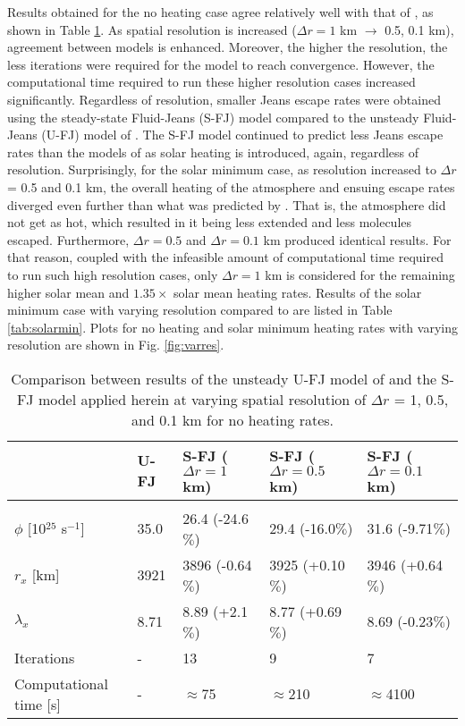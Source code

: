 \documentclass[times,12]{article}
\begin{document}
\indent Results obtained for the no heating case agree relatively well with that of \cite{Erwin2013}, as shown in Table \ref{tab:noheat}. As spatial resolution is increased ($\Delta r = 1$ km $\rightarrow$ 0.5, 0.1 km), agreement between models is enhanced. Moreover, the higher the resolution, the less iterations were required for the model to reach convergence. However, the computational time required to run these higher resolution cases increased significantly. Regardless of resolution, smaller Jeans escape rates were obtained using the steady-state Fluid-Jeans (S-FJ) model compared to the unsteady Fluid-Jeans (U-FJ) model of \cite{Erwin2013}. The S-FJ model continued to predict less Jeans escape rates than the models of \cite{Erwin2013} as solar heating is introduced, again, regardless of resolution. Surprisingly, for the solar minimum case, as resolution increased to $\Delta r$ = 0.5 and 0.1 km, the overall heating of the atmosphere and ensuing escape rates diverged even further than what was predicted by \cite{Erwin2013}. That is, the atmosphere did not get as hot, which resulted in it being less extended and less molecules escaped. Furthermore, $\Delta r = 0.5$ and $\Delta r = 0.1$ km produced identical results. For that reason, coupled with the infeasible amount of computational time required to run such high resolution cases, only $\Delta r = 1$ km is considered for the remaining higher solar mean and $1.35 \times$ solar mean heating rates. Results of the solar minimum case with varying resolution compared to \cite{Erwin2013} are listed in Table \ref{tab:solarmin}.
Plots for no heating and solar minimum heating rates with varying resolution are shown in Fig. \ref{fig:varres}.\\
\newpage
\begin{table}[h!]
\centering
\caption{Comparison between results of the unsteady U-FJ model of \cite{Erwin2013} and the S-FJ model applied herein at varying spatial resolution of $\Delta r$ = 1, 0.5, and 0.1 km for no heating rates.}
\begin{tabular}{lllll}
\hline
& U-FJ & S-FJ ($\Delta r = 1$ km) & S-FJ ($\Delta r = 0.5$ km) & S-FJ ($\Delta r = 0.1$ km)\\
\hline \vspace{-0.1in}\\
$\phi$ [10$^{25}$ s$^{-1}$] & 35.0 & 26.4 (-24.6$\%$) & 29.4 (-16.0$\%$) & 31.6 (-9.71$\%$) \\
$r_x$ [km] & 3921 & 3896 (-0.64$\%$) & 3925 (+0.10$\%$) & 3946 (+0.64$\%$)\\
$\lambda_x$ & 8.71 & 8.89 (+2.1$\%$) & 8.77 (+0.69$\%$) & 8.69 (-0.23$\%$)\\
Iterations & - & 13 & 9 & 7\\
Computational time [s] & - & $\approx$75 & $\approx$210 & $\approx$4100 \\
\hline
\end{tabular}
\label{tab:noheat}
\end{table}
\end{document}
